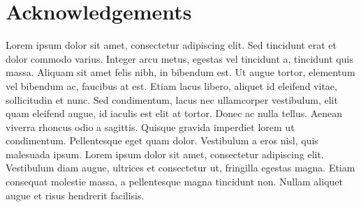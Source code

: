 \documentclass[letterpaper, 10 pt, conference]{ieeeconf}
\begin{document}
\section{Acknowledgements}
Lorem ipsum dolor sit amet, consectetur adipiscing elit. Sed tincidunt erat et dolor commodo varius. Integer arcu metus, egestas vel tincidunt a, tincidunt quis massa. Aliquam sit amet felis nibh, in bibendum est. Ut augue tortor, elementum vel bibendum ac, faucibus at est. Etiam lacus libero, aliquet id eleifend vitae, sollicitudin et nunc. Sed condimentum, lacus nec ullamcorper vestibulum, elit quam eleifend augue, id iaculis est elit at tortor. Donec ac nulla tellus. Aenean viverra rhoncus odio a sagittis. Quisque gravida imperdiet lorem ut condimentum. Pellentesque eget quam dolor. Vestibulum a eros nisl, quis malesuada ipsum. Lorem ipsum dolor sit amet, consectetur adipiscing elit. Vestibulum diam augue, ultrices et consectetur ut, fringilla egestas magna. Etiam consequat molestie massa, a pellentesque magna tincidunt non. Nullam aliquet augue et risus hendrerit facilisis.



\end{document}
